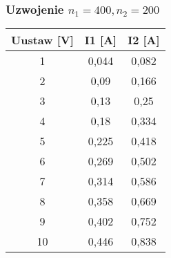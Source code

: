 \documentclass[polish,a4paper]{article}
\begin{document}

\subsubsection{Uzwojenie $n_1 = 400, n_2 = 200$}
\begin{table}[H]
\centering
\begin{tabular}{|c|c|c|}
\hline
Uustaw [V] &  I1 [A] &  I2 [A]  \\
\hline
1 &  0,044 &  0,082  \\
2 &  0,09 &  0,166  \\
3 &  0,13 &  0,25 \\
4 &  0,18 &  0,334  \\
5 &  0,225 &  0,418 \\
6 &  0,269 &  0,502  \\
7 &  0,314 &  0,586  \\
8 &  0,358 &  0,669 \\
9 &  0,402 &  0,752 \\
10 &  0,446 &  0,838  \\
\hline
\end{tabular}
\end{table}

\end{document}
